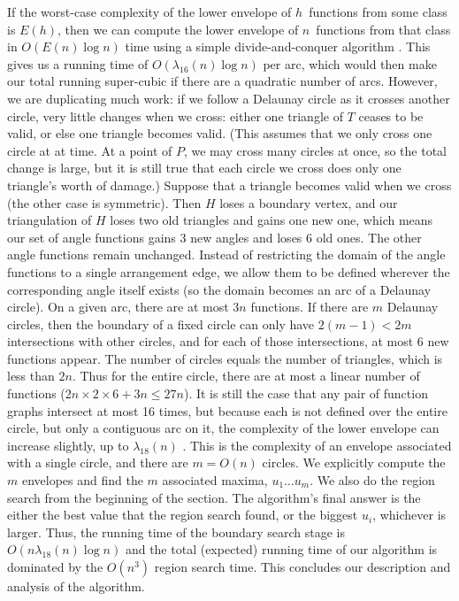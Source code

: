 \documentclass{cccg13}
\begin{document}
If the worst-case complexity of the lower envelope of $h$~functions from some class is $E(h)$, then we can compute the lower envelope of $n$~functions from that class in $O(E(n)\log n)$ time using a simple divide-and-conquer algorithm \cite[Theorem 6.1]{ds}.  This gives us a running time of $O(\lambda_{16}(n)\log n)$ per arc, which would then make our total running super-cubic if there are a quadratic number of arcs.  However, we are duplicating much work: if we follow a Delaunay circle as it crosses another circle, very little changes when we cross: either one triangle of $T$ ceases to be valid, or else one triangle becomes valid.  (This assumes that we only cross one circle at at time.  At a point of $P$, we may cross many circles at once, so the total change is large, but it is still true that each circle we cross does only one triangle's worth of damage.)  Suppose that a triangle becomes valid when we cross (the other case is symmetric).  Then $H$ loses a boundary vertex, and our triangulation of $H$ loses two old triangles and gains one new one, which means our set of angle functions gains 3 new angles and loses 6 old ones.  The other angle functions remain unchanged.  Instead of restricting the domain of the angle functions to a single arrangement edge, we allow them to be defined wherever the corresponding angle itself exists (so the domain becomes an arc of a Delaunay circle).  On a given arc, there are at most $3n$ functions.  If there are $m$ Delaunay circles, then the boundary of a fixed circle can only have $2(m-1)<2m$ intersections with other circles, and for each of those intersections, at most 6 new functions appear.  The number of circles equals the number of triangles, which is less than $2n$.  Thus for the entire circle, there are at most a linear number of functions ($2n\times2\times6+3n\le27n$).  It is still the case that any pair of function graphs intersect at most 16 times, but because each is not defined over the entire circle, but only a contiguous arc on it, the complexity of the lower envelope can increase slightly, up to $\lambda_{18}(n)$ \cite{ds}.  This is the complexity of an envelope associated with a single circle, and there are $m=O(n)$ circles.  We explicitly compute the $m$ envelopes and find the $m$ associated maxima, $u_1\ldots u_m$.  We also do the region search from the beginning of the section.  The algorithm's final answer is the either the best value that the region search found, or the biggest $u_i$, whichever is larger.  Thus, the running time of the boundary search stage is $O(n\lambda_{18}(n)\log n)$ and the total (expected) running time of our algorithm is dominated by the $O(n^3)$ region search time.  This concludes our description and analysis of the algorithm.
\end{document}
